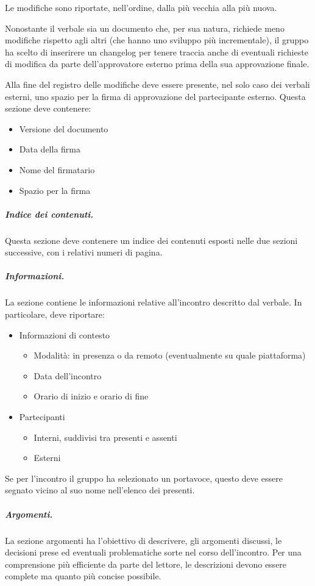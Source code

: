 Le modifiche sono riportate, nell'ordine, dalla più vecchia alla più nuova.
\par Nonostante il verbale sia un documento che, per sua natura, richiede meno modifiche rispetto agli altri (che hanno uno sviluppo più incrementale), il gruppo ha scelto di inserirere un changelog per tenere traccia anche di eventuali richieste di modifica da parte dell'approvatore esterno prima della sua approvazione finale.
\par Alla fine del registro delle modifiche deve essere presente, nel solo caso dei verbali esterni, uno spazio per la firma di approvazione del partecipante esterno. Questa sezione deve contenere:
\begin{itemize}
    \item Versione del documento
    \item Data della firma
    \item Nome del firmatario
    \item Spazio per la firma
\end{itemize}
\subparagraph{Indice dei contenuti.}
Questa sezione deve contenere un indice dei contenuti esposti nelle due sezioni successive, con i relativi numeri di pagina.
\subparagraph{Informazioni.}
La sezione contiene le informazioni relative all'incontro descritto dal verbale. In particolare, deve riportare:
\begin{itemize}
    \item Informazioni di contesto
    \begin{itemize}
        \item Modalità: in presenza o da remoto (eventualmente su quale piattaforma)
        \item Data dell'incontro
        \item Orario di inizio e orario di fine
    \end{itemize}
    \item Partecipanti
    \begin{itemize}
        \item Interni, suddivisi tra presenti e assenti
        \item Esterni
    \end{itemize}
\end{itemize}
Se per l'incontro il gruppo ha selezionato un portavoce, questo deve essere segnato vicino al suo nome nell'elenco dei presenti.
\subparagraph{Argomenti.}
La sezione argomenti ha l'obiettivo di descrivere, gli argomenti discussi, le decisioni prese ed eventuali problematiche sorte nel corso dell'incontro. Per una comprensione più efficiente da parte del lettore, le descrizioni devono essere complete ma quanto più concise possibile.
